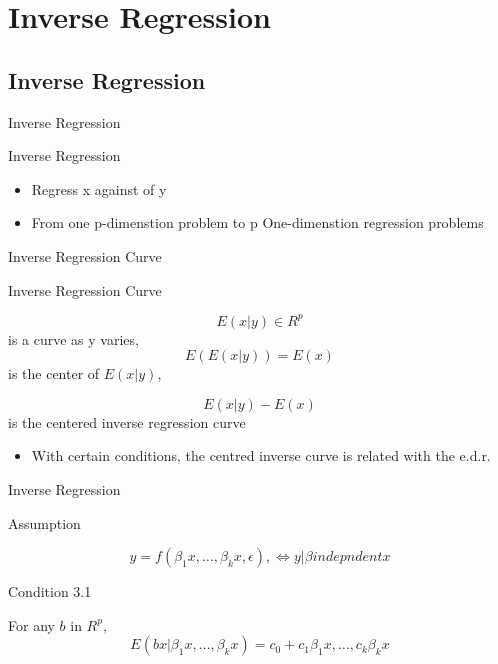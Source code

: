 \documentclass[ignorenonframetext,]{beamer}
\providecommand{\tightlist}{%
  \setlength{\itemsep}{0pt}\setlength{\parskip}{0pt}}
\begin{document}
\section{Inverse Regression}\label{inverse-regression}

\subsection{Inverse Regression}\label{inverse-regression-1}

\begin{frame}{Inverse Regression}

\begin{block}{Inverse Regression}

\begin{itemize}
\tightlist
\item
  Regress x against of y
\item
  From one p-dimenstion problem to p One-dimenstion regression problems
\end{itemize}

\end{block}

\end{frame}

\begin{frame}{Inverse Regression Curve}

\begin{block}{Inverse Regression Curve}

\[
  E(x|y) \in R^p
\] is a curve as y varies, \[
  E(E(x|y)) = E(x)
\] is the center of \(E(x|y)\),

\[ E(x|y) - E(x)\] is the centered inverse regression curve

\begin{itemize}
\tightlist
\item
  With certain conditions, the centred inverse curve is related with the
  e.d.r.
\end{itemize}

\end{block}

\end{frame}

\begin{frame}{Inverse Regression}

\begin{block}{Assumption}

\[
  y = f(\beta_1x, \dots, \beta_kx, \epsilon), \Leftrightarrow y|\beta indepndent x  
\]

\end{block}

\begin{block}{Condition 3.1}

For any \(b\) in \(R^p\),
\[E(bx|\beta_1x, \dots, \beta_kx) = c_0 + c_1\beta_1x, \dots, c_k\beta_kx\]

\end{block}

\end{frame}
\end{document}
